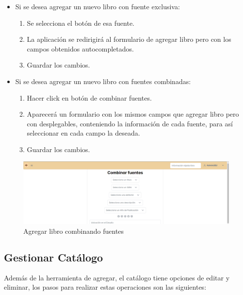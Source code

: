 \begin{itemize}
    \item Si se desea agregar un nuevo libro con fuente exclusiva:
    \begin{enumerate}
        \item Se selecciona el botón de esa fuente.
        \item La aplicación se redirigirá al formulario de agregar libro pero con los campos obtenidos autocompletados.
        \item Guardar los cambios.
    \end{enumerate}
    \item Si se desea agregar un nuevo libro con fuentes combinadas:
    \begin{enumerate}
        \item Hacer click en botón de combinar fuentes.
        \item Aparecerá un formulario con los mismos campos que agregar libro pero con desplegables, conteniendo la información de cada fuente, para así seleccionar en cada campo la deseada.
        \item Guardar los cambios.
    \end{enumerate}
\end{itemize}

\begin{figure}[h]
    \centering
    \includegraphics[width=1\linewidth]{Imagenes/ManualCombinar.png}
    \caption{Agregar libro combinando fuentes}
    \label{Agregar libro combinando fuentes}
\end{figure}
\FloatBarrier

\subsection{Gestionar Catálogo}
Además de la herramienta de agregar, el catálogo tiene opciones de editar y eliminar, los pasos para realizar estas operaciones son las siguientes:

